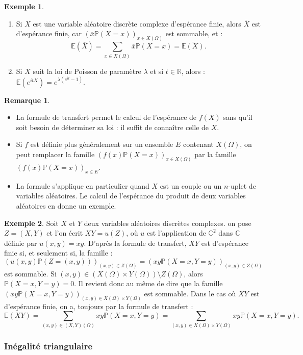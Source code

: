 \documentclass[french]{article}
\renewcommand{\P}{\mathbb{P}}
\newcommand{\R}{\mathbb{R}}
\newcommand{\C}{\mathbb{C}}
\newcommand{\E}{\mathbb{E}}
\theoremstyle{plain}
\theoremstyle{definition}
\newtheorem*{ex}{Exemple}
\newtheorem*{rmq}{Remarque}
\theoremstyle{remark}
\begin{document}
\begin{ex}
	\begin{enumerate}
		\item Si $X$ est une variable aléatoire discrète complexe d'espérance finie, alors $\overline{X}$ est d'espérance finie, car $(\overline{x}\P(X=x))_{x\in X(\Omega)}$ est sommable, et :
		$$\E(\overline{X})=\sum_{x\in X(\Omega)}\overline{x}\P(X=x)=\overline{\E(X)}.$$ 
		\item Si $X$ suit la loi de Poisson de paramètre $\lambda$ et si $t\in\R$, alors : $\E(e^{itX})=e^{\lambda(e^{it}-1)}$.
	\end{enumerate}
\end{ex}

\begin{rmq}
	\begin{itemize}
		\item La formule de transfert permet le calcul de l'espérance de $f(X)$ sans qu'il soit besoin de déterminer sa loi : il suffit de connaître celle de $X$.
		\item Si $f$ est définie plus généralement sur un ensemble $E$ contenant $X(\Omega)$, on peut remplacer la famille $(f(x)\P(X=x))_{x\in X(\Omega)}$ par la famille $(f(x)\P(X=x))_{x\in E}$.
		\item La formule s'applique en particulier quand $X$ est un couple ou un $n$-uplet de variables aléatoires. Le calcul de l'espérance du produit de deux variables aléatoires en donne un exemple.
	\end{itemize}
\end{rmq}

\begin{ex}
	Soit $X$ et $Y$ deux variables aléatoires discrètes complexes. on pose $Z=(X,Y)$ et l'on écrit $XY=u(Z)$, où $u$ est l'application de $\C^2$ dans $\C$ définie par $u(x,y)=xy$. D'après la formule de transfert, $XY$ est d'espérance finie si, et seulement si, la famille :
	$$\left(u(x,y)\P(Z=(x,y))\right)_{(x,y)\in Z(\Omega)}=\left(xy\P(X=x,Y=y)\right)_{(x,y)\in Z(\Omega)}$$ est sommable. Si $(x,y)\in(X(\Omega)\times Y(\Omega))\setminus Z(\Omega)$, alors $\P(X=x,Y=y)=0$. Il revient donc au même de dire que la famille $(xy\P(X=x,Y=y))_{(x,y)\in X(\Omega)\times Y(\Omega)}$ est sommable. Dans le cas où $XY$ est d'espérance finie, on a, toujours par la formule de transfert :
	$$\E(XY)=\sum_{(x,y)\in (X,Y)(\Omega)}xy\P(X=x,Y=y)=\sum_{(x,y)\in X(\Omega)\times Y(\Omega)}xy\P(X=x,Y=y).$$
\end{ex}

\subsubsection*{Inégalité triangulaire}
\end{document}
